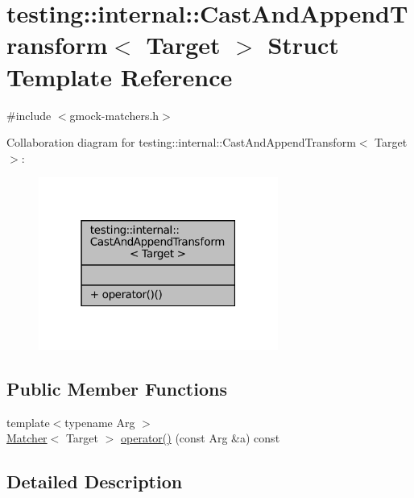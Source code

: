 \hypertarget{structtesting_1_1internal_1_1CastAndAppendTransform}{}\section{testing\+:\+:internal\+:\+:Cast\+And\+Append\+Transform$<$ Target $>$ Struct Template Reference}
\label{structtesting_1_1internal_1_1CastAndAppendTransform}


{\ttfamily \#include $<$gmock-\/matchers.\+h$>$}



Collaboration diagram for testing\+:\+:internal\+:\+:Cast\+And\+Append\+Transform$<$ Target $>$\+:
\nopagebreak
\begin{figure}[H]
\begin{center}
\leavevmode
\includegraphics[width=223pt]{structtesting_1_1internal_1_1CastAndAppendTransform__coll__graph}
\end{center}
\end{figure}
\subsection*{Public Member Functions}
\begin{DoxyCompactItemize}
\item 
{\footnotesize template$<$typename Arg $>$ }\\\hyperlink{classtesting_1_1Matcher}{Matcher}$<$ Target $>$ \hyperlink{structtesting_1_1internal_1_1CastAndAppendTransform_a90e722b0df4f0e6368bd89b848b71f45}{operator()} (const Arg \&a) const
\end{DoxyCompactItemize}


\subsection{Detailed Description}
